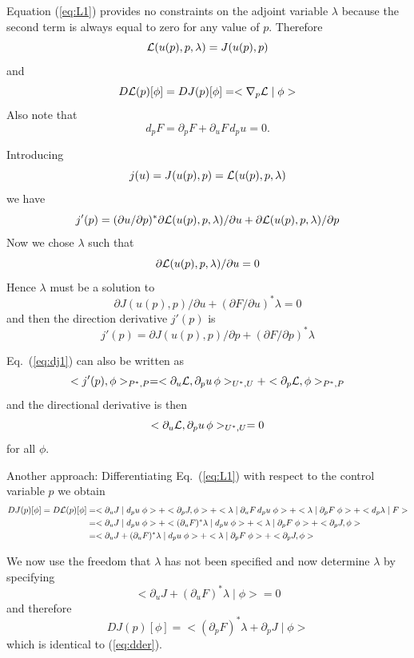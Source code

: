 \documentclass[10pt,a4paper]{book}
\newcommand{\p}{\partial}
\begin{document}
Equation (\ref{eq:L1}) provides no constraints on the adjoint variable $\lambda$ because the
second term is always equal to zero for any value of $p$. 
Therefore
\[
{\cal L}(u(p),p,\lambda)=J(u(p),p)
\]
and
\[
D {\cal L}(p)[\phi] = D J(p)[\phi] =  <\nabla_p {\cal L}  \mid \phi >  
\]
Also note that 
\[
d_p F= \p_p F + \p_u F \, d_p u =0  .
\]


Introducing
\[
j(u)=J(u(p),p)= {\cal L}(u(p),p,\lambda)
\]
we have
\begin{equation}
j'(p)= (\p u / \p p )^\ast \p {\cal L}(u(p),p,\lambda)/\p u + \p {\cal L}(u(p),p,\lambda)/ \p p
\label{eq:dj1}
\end{equation}
Now we chose $\lambda$ such that 
\[
\p {\cal L}(u(p),p,\lambda)/ \p u=0
\]
Hence $\lambda$ must be a solution to
\[
\p J(u(p),p) / \p u + (\p F/\p u)^\ast \lambda=0
\]
and then the direction derivative $j'(p)$ is
\begin{equation}
j'(p)= \p J(u(p),p)/ \p p + (\p F / \p p)^\ast  \lambda
\label{eq:dder}
\end{equation}

Eq.~(\ref{eq:dj1}) can also be written as
\[
< j'(p), \phi>_{P^\ast, P}= < \p_u {\cal L} , \p_p u \,  \phi >_{U^\ast , U}  + < \p_p {\cal L} , \phi>_{P^\ast,P}  
\]
and the directional derivative is then 
\[
<\p_u {\cal L}, \p_p u \, \phi>_{U^\ast, U}=0
\]
for all $\phi$.

Another approach: Differentiating Eq.~(\ref{eq:L1}) with respect to the control variable $p$ we obtain
\begin{align*}
  D J(p)[\phi] = D {\cal L}(p)[\phi]  
   & = < \p_u J \mid d_p u \; \phi > + < \p_p  J, \phi >  + < \lambda  \mid \p_u F \, d_p u \; \phi > + < \lambda  \mid \p_p F \; \phi > + < d_p \lambda \mid F > \\
  & = < \p_u J \mid d_p u \; \phi >   + < (\p_u F)^\ast\lambda  \mid  d_p u \; \phi > + < \lambda  \mid \p_p F \; \phi > + < \p_p  J, \phi > \\
  & = < \p_u J +( \p_u F)^\ast\lambda \mid d_p u \; \phi >   + < \lambda  \mid \p_p F \; \phi > + < \p_p  J, \phi >
\end{align*}


We now use the freedom that $\lambda$ has not been specified and now determine $\lambda$ by specifying
\[
  < \p_u J +( \p_u F)^\ast\lambda \mid \phi >  =0
  \]
and therefore 
\begin{equation}
  D J(p)[\phi] = < (\p_p F)^\ast \lambda  + \p_p J \mid  \phi >
  \label{eq:idder}
\end{equation}
which is  identical to (\ref{eq:dder}).
\end{document}
